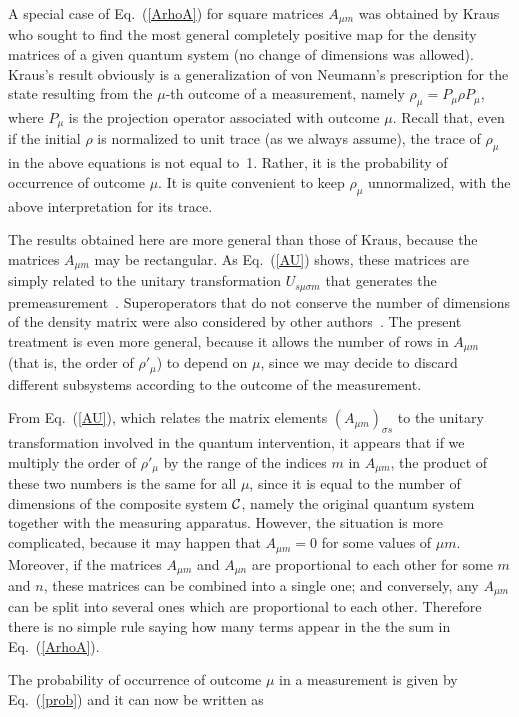 \documentclass[12pt]{article}
\def\Eq{Eq.~(\ref}
\def\cC{$\cal C$}
\begin{document}
A special case of Eq.~(\ref{ArhoA}) for square matrices $A_{\mu m}$
was obtained by Kraus~\cite{Kraus} who sought to find the most general
completely positive map for the density matrices of a given quantum
system (no change of dimensions was allowed). Kraus's result obviously
is a generalization of von Neumann's prescription for the state
resulting from the $\mu$-th outcome of a measurement, namely
$\rho_\mu=P_\mu\rho P_\mu$, where $P_\mu$ is the projection operator
associated with outcome $\mu$. Recall that, even if the initial $\rho$
is normalized to unit trace (as we always assume), the trace of
$\rho_\mu$ in the above equations is not equal to~1. Rather, it is the
probability of occurrence of outcome $\mu$. It is quite convenient to
keep $\rho_\mu$ unnormalized, with the above interpretation for its
trace.

The results obtained here are more general than those of Kraus, because
the matrices $A_{\mu m}$ may be rectangular. As \Eq{AU}) shows, these
matrices are simply related to the unitary transformation $U_{s\mu\sigma
m}$ that generates the premeasurement~\cite{ben}. Super\-operators that
do not conserve the number of dimensions of the density matrix were also
considered by other authors~\cite{Ben}. The present treatment is even
more general, because it allows the number of rows in $A_{\mu m}$ (that
is, the order of $\rho'_\mu$) to depend on $\mu$, since we may decide to
discard different subsystems according to the outcome of the
measurement. 

{}From \Eq{AU}), which relates the matrix elements $(A_{\mu m})_{\sigma
s}$ to the unitary transformation involved in the quantum intervention,
it appears that if we multiply the order of $\rho'_\mu$ by the range
of the indices $m$ in $A_{\mu m}$, the product of these two numbers is
the same for all $\mu$, since it is equal to the number of dimensions of
the composite system \cC, namely the original quantum system together
with the measuring apparatus. However, the situation is more
complicated, because it may happen that $A_{\mu m}=0$ for some values of
$\mu m$. Moreover, if the matrices $A_{\mu m}$ and $A_{\mu n}$ are
proportional to each other for some $m$ and $n$, these matrices can be
combined into a single one; and conversely, any $A_{\mu m}$ can be split
into several ones which are proportional to each other. Therefore there
is no simple rule saying how many terms appear in the the sum in
\Eq{ArhoA}).

The probability of occurrence of outcome $\mu$ in a measurement is given
by \Eq{prob}) and it can now be written as
\end{document}
